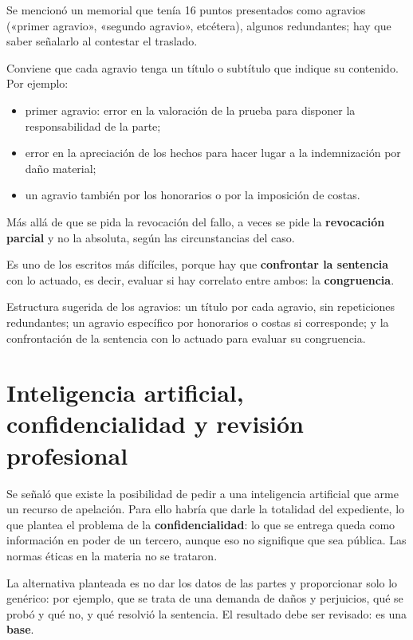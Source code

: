 \documentclass[12pt,oneside]{book}
\begin{document}
Se mencionó un memorial que tenía 16 puntos presentados como agravios («primer agravio», «segundo agravio», etcétera), algunos redundantes; hay que saber señalarlo al contestar el traslado.

Conviene que cada agravio tenga un título o subtítulo que indique su contenido. Por ejemplo:

\begin{itemize}
    \item primer agravio: error en la valoración de la prueba para disponer la responsabilidad de la parte;
    \item error en la apreciación de los hechos para hacer lugar a la indemnización por daño material;
    \item un agravio también por los honorarios o por la imposición de costas.
\end{itemize}

Más allá de que se pida la revocación del fallo, a veces se pide la \textbf{revocación parcial} y no la absoluta, según las circunstancias del caso.

Es uno de los escritos más difíciles, porque hay que \textbf{confrontar la sentencia} con lo actuado, es decir, evaluar si hay correlato entre ambos: la \textbf{congruencia}.

\begin{important}
Estructura sugerida de los agravios: un título por cada agravio, sin repeticiones redundantes; un agravio específico por honorarios o costas si corresponde; y la confrontación de la sentencia con lo actuado para evaluar su congruencia.
\end{important}

\section{Inteligencia artificial, confidencialidad y revisión profesional}

Se señaló que existe la posibilidad de pedir a una inteligencia artificial que arme un recurso de apelación. Para ello habría que darle la totalidad del expediente, lo que plantea el problema de la \textbf{confidencialidad}: lo que se entrega queda como información en poder de un tercero, aunque eso no signifique que sea pública. Las normas éticas en la materia no se trataron.

La alternativa planteada es no dar los datos de las partes y proporcionar solo lo genérico: por ejemplo, que se trata de una demanda de daños y perjuicios, qué se probó y qué no, y qué resolvió la sentencia. El resultado debe ser revisado: es una \textbf{base}.
\end{document}
